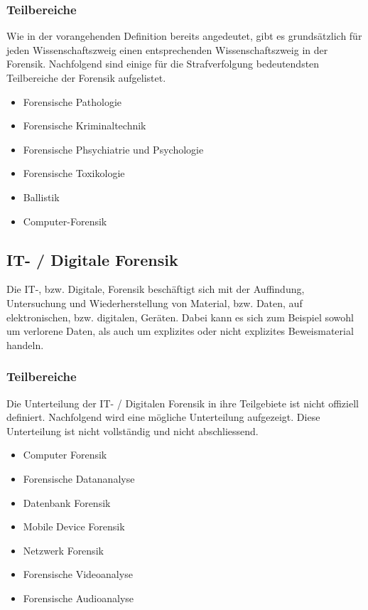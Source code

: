 \subsubsection{Teilbereiche}
Wie in der vorangehenden Definition bereits angedeutet, gibt es grundsätzlich für jeden Wissenschaftszweig einen entsprechenden Wissenschaftszweig in der Forensik. Nachfolgend sind einige für die Strafverfolgung bedeutendsten Teilbereiche der Forensik aufgelistet.

\begin{itemize}
\item Forensische Pathologie
\item Forensische Kriminaltechnik
\item Forensische Phsychiatrie und Psychologie
\item Forensische Toxikologie
\item Ballistik
\item Computer-Forensik
\end{itemize}


\subsection{IT- / Digitale Forensik}
Die IT-, bzw. Digitale, Forensik beschäftigt sich mit der Auffindung, Untersuchung und Wiederherstellung von Material, bzw. Daten, auf elektronischen, bzw. digitalen, Geräten. Dabei kann es sich zum Beispiel sowohl um verlorene Daten, als auch um explizites oder nicht explizites Beweismaterial handeln.

\subsubsection{Teilbereiche}
Die Unterteilung der IT- / Digitalen Forensik in ihre Teilgebiete ist nicht offiziell definiert. Nachfolgend wird eine mögliche Unterteilung aufgezeigt. Diese Unterteilung ist nicht vollständig und nicht abschliessend.

\begin{itemize}
\item Computer Forensik
\item Forensische Datananalyse
\item Datenbank Forensik
\item Mobile Device Forensik
\item Netzwerk Forensik
\item Forensische Videoanalyse
\item Forensische Audioanalyse

\end{itemize}


